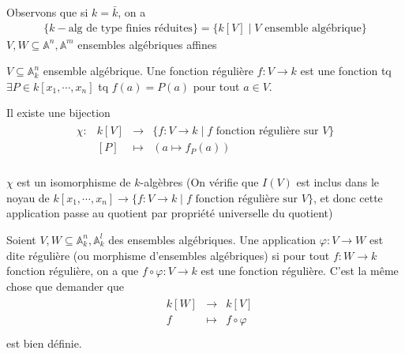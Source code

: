         Observons que si $k = \bar k$, on a
        \begin{align*}
            \{k-\text{alg de type finies réduites}\} = \{k[V] \mid V \text{ ensemble algébrique}\}
        \end{align*}
        $V,W \subseteq \mathbb{A}^n, \mathbb{A}^m$ ensembles algébriques affines
        \begin{defi}
            $V \subseteq \mathbb{A}_k^n$ ensemble algébrique. Une fonction régulière $f : V \to k$ est une fonction tq $\exists P \in k[x_1, \cdots, x_n]$ tq $f(a) = P(a)$ pour tout $a \in V$.
        \end{defi}
        \begin{lemm}
            Il existe une bijection
            \begin{align*}
                \begin{array}{cccc}
                    \chi : & k[V] & \to & \{f : V \to k \mid f \text{ fonction régulière sur } V\} \\
                    & [P] & \mapsto & (a \mapsto f_P(a) )\\
                \end{array}
            \end{align*}
        \end{lemm}
        \begin{remq}
            $\chi$ est un isomorphisme de $k$-algèbres (On vérifie que $I(V)$ est inclus dans le noyau de $k[x_1, \cdots, x_n] \to \{f : V \to k \mid f \text{ fonction régulière sur } V\}$, et donc cette application passe au quotient par propriété universelle du quotient)
        \end{remq}
        \begin{defi}
            Soient $V,W \subseteq \mathbb{A}_k^{n}, \mathbb{A}_k^{l}$ des ensembles algébriques. Une application $\varphi : V \to W$ est dite régulière (ou morphisme d'ensembles algébriques) si pour tout $f : W \to k$ fonction régulière, on a que $f \circ \varphi : V \to k$ est une fonction régulière. C'est la même chose que demander que 
            \begin{align*}
                \begin{array}{cccc}
                    & k[W] & \to & k[V] \\
                    & f & \mapsto & f \circ \varphi \\
                \end{array}
            \end{align*}
            est bien définie.
        \end{defi}

